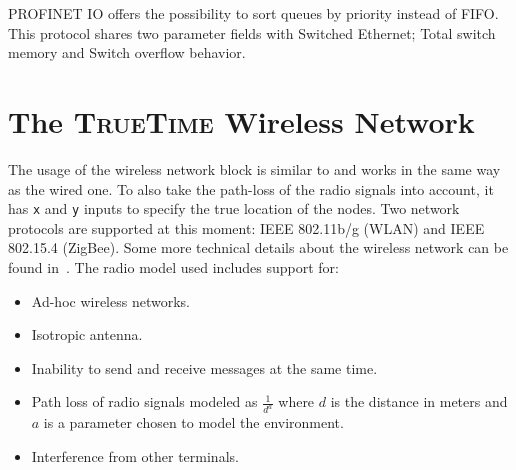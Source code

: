 \documentclass[final,twoside]{rapport}
\begin{document}
PROFINET IO offers the possibility to sort queues by priority instead
of FIFO. This protocol shares two parameter fields with Switched
Ethernet; Total switch memory and Switch overflow behavior.

\clearpage
\section{The \textsc{TrueTime} Wireless Network}

The usage of the wireless network block is similar to and works in the
same way as the wired one. To also take the path-loss of the radio
signals into account, it has {\tt x} and {\tt y} inputs to specify the
true location of the nodes. Two network protocols are supported at
this moment: IEEE 802.11b/g (WLAN) and IEEE 802.15.4 (ZigBee). Some
more technical details about the wireless network can be found
in~\cite{ohlin06lic}. The radio model used includes support for:
\begin{itemize}
\item Ad-hoc wireless networks.
\item Isotropic antenna.
\item Inability to send and receive messages at the same time.
\item Path loss of radio signals modeled as $\frac{1}{d^a}$ where $d$
  is the distance in meters and $a$ is a parameter chosen to
  model the environment.
\item Interference from other terminals.
\end{itemize}
\end{document}
